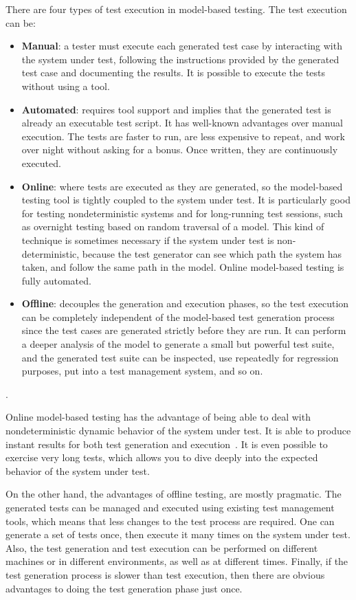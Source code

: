 There are four types of test execution in model-based testing. The test
execution can be:
\begin{itemize}
\item \textbf{Manual}: a tester must execute each generated test case by
interacting with the system under test, following the instructions provided by
the generated test case and documenting the results. It is possible to execute
the tests without using a tool.
\item \textbf{Automated}: requires tool support and implies that the
generated test is already an executable test script. It has well-known
advantages over manual execution. The tests are faster to run, are less
expensive to repeat, and work over night without asking for a bonus. Once
written, they are continuously executed.
\item \textbf{Online}: where tests are executed as they are generated, so the
model-based testing tool is tightly coupled to the system under test. It is
particularly good for testing nondeterministic systems and for long-running test
sessions, such as overnight testing based on random traversal of a model. This
kind of technique is sometimes necessary if the system under test is
non-deterministic, because the test generator can see which path the system has
taken, and follow the same path in the model. Online model-based testing is
fully automated.
\item \textbf{Offline}: decouples the generation and execution phases, so the
test execution can be completely independent of the model-based test generation
process since the test cases are generated strictly before they are run. It can
perform a deeper analysis of the model to generate a small but
powerful test suite, and the generated test suite can be inspected, use
repeatedly for regression purposes, put into a test management system, and so on.
\end{itemize}.

Online model-based testing has the advantage of being able to deal with
nondeterministic dynamic behavior of the system under test. It is able to
produce instant results for both test generation and execution~\cite{Kramer2016}.
It is even possible to exercise very long tests, which allows you to dive deeply
into the expected behavior of the system under test.

On the other hand, the advantages of offline testing, are mostly pragmatic. The
generated tests can be managed and executed using existing test management tools,
which means that less changes to the test process are required. One can generate
a set of tests once, then execute it many times on the system under test. Also,
the test generation and test execution can be performed on different
machines or in different environments, as well as at different times. Finally,
if the test generation process is slower than test execution, then there are
obvious advantages to doing the test generation phase just once.


